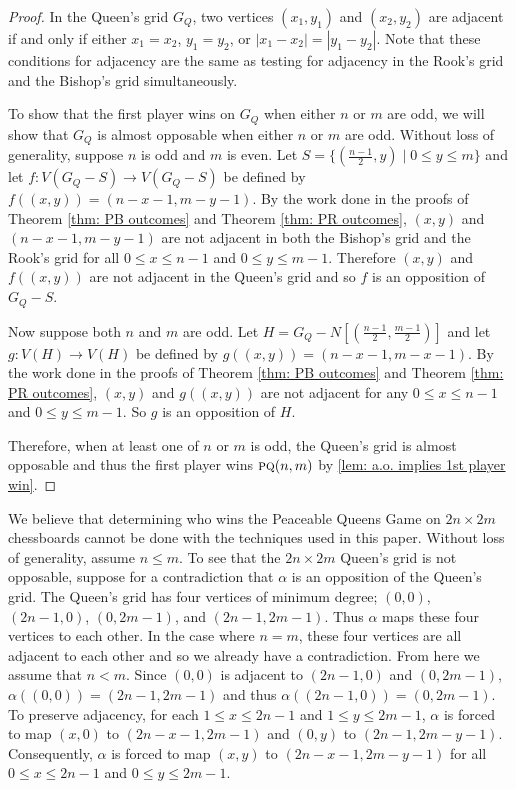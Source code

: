 \documentclass[11pt]{article}
\theoremstyle{definition}
\begin{document}
\begin{proof}
    In the Queen's grid $G_Q$, two vertices $(x_1, y_1)$ and $(x_2, y_2)$ are
    adjacent if and only if either $x_1 = x_2$, $y_1 = y_2$, or $|x_1 - x_2| =
    |y_1 - y_2|$. Note that these conditions for adjacency are the same as
    testing for adjacency in the Rook's grid and the Bishop's grid
    simultaneously. 

    To show that the first player wins on $G_Q$ when either $n$ or $m$ are odd,
    we will show that $G_Q$ is almost opposable when either $n$ or $m$ are odd.
    Without loss of generality, suppose $n$ is odd and $m$ is even. Let $S =
    \{(\frac{n-1}{2},y) \mid 0\leq y\leq m\}$ and let $f: V(G_Q - S) \to V(G_Q
    - S)$ be defined by $f((x,y)) = (n-x-1, m-y-1)$. By the work done in the
    proofs of Theorem \ref{thm: PB outcomes} and Theorem \ref{thm: PR
    outcomes}, $(x,y)$ and $(n-x-1, m-y-1)$ are not adjacent in both the
    Bishop's grid and the Rook's grid for all $0\leq x\leq n-1$ and $0\leq
    y\leq m-1$. Therefore $(x,y)$ and $f((x,y))$ are not adjacent in the
    Queen's grid and so $f$ is an opposition of $G_Q - S$. 

    Now suppose both $n$ and $m$ are odd. Let $H = G_Q - N[(\frac{n-1}{2},
    \frac{m-1}{2})]$ and let $g: V(H) \to V(H)$ be defined by $g((x,y)) =
    (n-x-1, m-x-1)$. By the work done in the proofs of  Theorem \ref{thm: PB
    outcomes} and Theorem \ref{thm: PR outcomes}, $(x,y)$ and $g((x,y))$ are
    not adjacent for any $0\leq x\leq n-1$ and $0\leq y\leq m-1$. So $g$ is an
    opposition of $H$.

    Therefore, when at least one of $n$ or $m$ is odd, the Queen's grid is
    almost opposable and thus the first player wins $\textsc{pq}(n,m)$ by
    \cref{lem: a.o. implies 1st player win}.
\end{proof}

We believe that determining who wins the Peaceable Queens Game on $2n \times
2m$ chessboards cannot be done with the techniques used in this paper. Without
loss of generality, assume $n\leq m$. To see that the $2n \times 2m$ Queen's
grid is not opposable, suppose for a contradiction that $\alpha$ is an
opposition of the Queen's grid. The Queen's grid has four vertices of minimum
degree; $(0,0)$, $(2n-1,0)$, $(0,2m-1)$, and $(2n-1,2m-1)$. Thus $\alpha$ maps
these four vertices to each other. In the case where $n=m$, these four vertices
are all adjacent to each other and so we already have a contradiction. From
here we assume that $n < m$. Since $(0,0)$ is adjacent to $(2n-1,0)$ and
$(0,2m-1)$, $\alpha((0,0)) = (2n-1, 2m-1)$ and thus $\alpha((2n-1, 0)) =
(0,2m-1)$. To preserve adjacency, for each $1\leq x\leq 2n-1$ and $1\leq y\leq
2m-1$, $\alpha$ is forced to map $(x,0)$ to $(2n-x-1, 2m-1)$ and $(0,y)$ to
$(2n-1, 2m-y-1)$. Consequently, $\alpha$ is forced to map $(x,y)$ to $(2n-x-1,
2m-y-1)$ for all $0\leq x\leq 2n-1$ and $0\leq y\leq 2m-1$.
\end{document}
